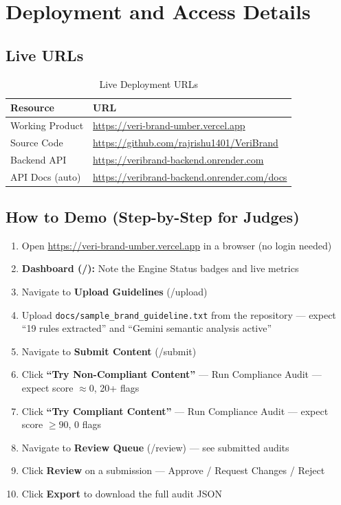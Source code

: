 \documentclass[11pt,a4paper]{article}
\begin{document}
\section{Deployment and Access Details}

\subsection{Live URLs}

\begin{table}[H]
\centering
\begin{tabular}{p{} p{}}
\toprule
\textbf{Resource} & \textbf{URL} \\
\midrule
Working Product & \url{https://veri-brand-umber.vercel.app} \\
\addlinespace
Source Code & \url{https://github.com/rajrishu1401/VeriBrand} \\
\addlinespace
Backend API & \url{https://veribrand-backend.onrender.com} \\
\addlinespace
API Docs (auto) & \url{https://veribrand-backend.onrender.com/docs} \\
\bottomrule
\end{tabular}
\caption{Live Deployment URLs}
\end{table}

\subsection{How to Demo (Step-by-Step for Judges)}

\begin{enumerate}
    \item Open \url{https://veri-brand-umber.vercel.app} in a browser (no login needed)
    \item \textbf{Dashboard (/):} Note the Engine Status badges and live metrics
    \item Navigate to \textbf{Upload Guidelines} (/upload)
    \item Upload \texttt{docs/sample\_brand\_guideline.txt} from the repository --- expect ``19 rules extracted'' and ``Gemini semantic analysis active''
    \item Navigate to \textbf{Submit Content} (/submit)
    \item Click \textbf{``Try Non-Compliant Content''} --- Run Compliance Audit --- expect score $\approx 0$, 20+ flags
    \item Click \textbf{``Try Compliant Content''} --- Run Compliance Audit --- expect score $\geq 90$, 0 flags
    \item Navigate to \textbf{Review Queue} (/review) --- see submitted audits
    \item Click \textbf{Review} on a submission --- Approve / Request Changes / Reject
    \item Click \textbf{Export} to download the full audit JSON
\end{enumerate}
\end{document}
